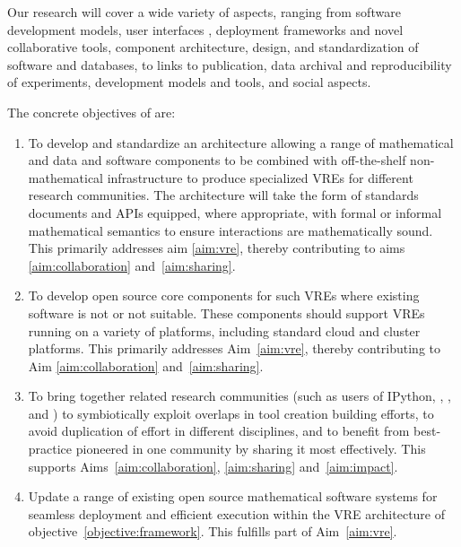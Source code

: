 \documentclass[noworkareas,deliverables,keys]{euproposal}                  %
\begin{document}
\begin{proposal}
Our research will cover a wide variety of aspects, ranging from
software development models, user interfaces , deployment frameworks and novel collaborative tools,
component architecture, design, and standardization of software
 and databases, to links to publication, data archival
and reproducibility of experiments, development models and tools, and
social aspects.

The concrete objectives of \TheProject are:

\begin{enumerate}
\item\label{objective:framework} To develop and standardize
  an architecture allowing a range of mathematical and
  data and software components to be combined 
  with off-the-shelf non-mathematical infrastructure to produce
  specialized VREs for different research communities. The
  architecture will take the form of standards documents and APIs
  equipped, where appropriate, with formal or informal mathematical
  semantics to ensure interactions are mathematically sound. This primarily
  addresses aim \ref{aim:vre}, thereby contributing to aims
  \ref{aim:collaboration} and~\ref{aim:sharing}. 

\item\label{objectives:core} To develop open source core components
  for such VREs where existing software is not  or not suitable. These
  components should support VREs running on a variety of
  platforms, including standard cloud and cluster platforms. This primarily
  addresses Aim~\ref{aim:vre}, thereby contributing to Aim
  \ref{aim:collaboration} and~\ref{aim:sharing}.

\item \label{objective:community} To bring together related research
  communities (such as users of IPython, \Sage, \Singular, and \GAP)
  to symbiotically exploit overlaps in tool creation building efforts,
  to avoid duplication of effort in different disciplines, and to
  benefit from best-practice pioneered in one community by sharing it
  most effectively. This supports Aims~\ref{aim:collaboration},
  \ref{aim:sharing} and~\ref{aim:impact}.

\item \label{objective:updates} Update a range of existing open source
  mathematical software systems for seamless deployment and efficient
  execution within the VRE architecture of objective~\ref{objective:framework}.
  This fulfills part of Aim~\ref{aim:vre}.



\end{enumerate}
\end{proposal}
\end{document}
